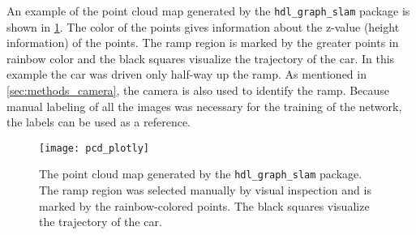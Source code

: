 An example of the point cloud map generated by the \texttt{hdl\_graph\_slam} package is shown in \cref{fig:pcd_plotly}.
The color of the points gives information about the z-value (height information) of the points.
The ramp region is marked by the greater points in rainbow color and the black squares visualize the trajectory of the car.
In this example the car was driven only half-way up the ramp.
As mentioned in \cref{sec:methods_camera}, the camera is also used to identify the ramp.
Because manual labeling of all the images was necessary for the training of the network, the labels can be used as a reference.
\begin{figure}[htb]
    \centering
    \texttt{[image: pcd\_plotly]}
    \caption[Generated point cloud map]{The point cloud map generated by the \texttt{hdl\_graph\_slam} package. The ramp region was selected manually by visual inspection and is marked by the rainbow-colored points. The black squares visualize the trajectory of the car.}
    \label{fig:pcd_plotly}
\end{figure}



